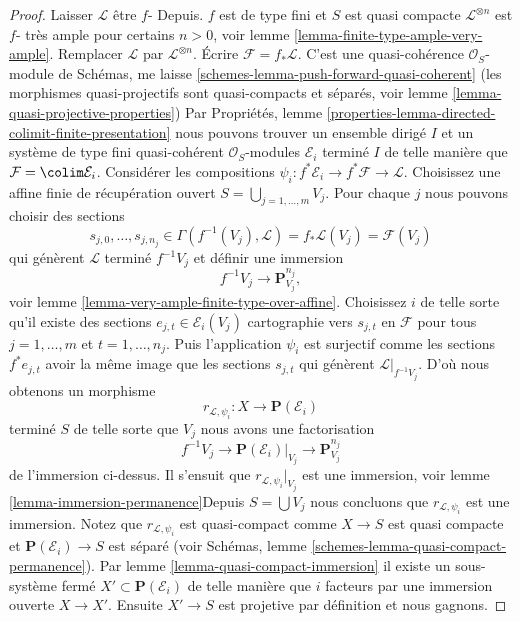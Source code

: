 \begin{proof}

Laisser $\mathcal{L}$ être $f$- Depuis. $f$ est de type fini et $S$ est quasi compacte $\mathcal{L}^{\otimes n}$ est $f$- très ample pour certains $n > 0$, voir lemme \ref{lemma-finite-type-ample-very-ample}. Remplacer $\mathcal{L}$ par $\mathcal{L}^{\otimes n}$. Écrire $\mathcal{F} = f_*\mathcal{L}$. C'est une quasi-cohérence
$\mathcal{O}_S$-module de Schémas, me laisse \ref{schemes-lemma-push-forward-quasi-coherent}
(les morphismes quasi-projectifs sont quasi-compacts et séparés, voir lemme \ref{lemma-quasi-projective-properties}) Par Propriétés, lemme \ref{properties-lemma-directed-colimit-finite-presentation}
nous pouvons trouver un ensemble dirigé $I$ et un système de type fini quasi-cohérent $\mathcal{O}_S$-modules $\mathcal{E}_i$
terminé $I$ de telle manière que $\mathcal{F} = \colim \mathcal{E}_i$. Considérer les compositions
$\psi_i : f^*\mathcal{E}_i \to f^*\mathcal{F} \to \mathcal{L}$. Choisissez une affine finie de récupération ouvert $S = \bigcup_{j = 1, \ldots, m} V_j$. Pour chaque $j$ nous pouvons choisir des sections
$$
s_{j, 0}, \ldots, s_{j, n_j} \in
\Gamma(f^{-1}(V_j), \mathcal{L}) = f_*\mathcal{L}(V_j) = \mathcal{F}(V_j)
$$
qui génèrent $\mathcal{L}$ terminé $f^{-1}V_j$ et définir une immersion
$$
f^{-1}V_j \longrightarrow \mathbf{P}^{n_j}_{V_j},
$$
voir lemme \ref{lemma-very-ample-finite-type-over-affine}. Choisissez $i$ de telle sorte qu'il existe des sections $e_{j, t} \in \mathcal{E}_i(V_j)$
cartographie vers $s_{j, t}$ en $\mathcal{F}$ pour tous $j = 1, \ldots, m$ et
$t = 1, \ldots, n_j$. Puis l'application $\psi_i$ est surjectif comme les sections $f^*e_{j, t}$ avoir la même image que les sections $s_{j, t}$
qui génèrent $\mathcal{L}|_{f^{-1}V_j}$. D'où nous obtenons un morphisme
$$
r_{\mathcal{L}, \psi_i} : X \longrightarrow \mathbf{P}(\mathcal{E}_i)
$$
terminé $S$ de telle sorte que $V_j$ nous avons une factorisation
$$
f^{-1}V_j \to \mathbf{P}(\mathcal{E}_i)|_{V_j} \to \mathbf{P}^{n_j}_{V_j}
$$
de l'immersion ci-dessus. Il s'ensuit que $r_{\mathcal{L}, \psi_i}|_{V_j}$
est une immersion, voir lemme \ref{lemma-immersion-permanence}Depuis $S = \bigcup V_j$ nous concluons que $r_{\mathcal{L}, \psi_i}$
est une immersion. Notez que $r_{\mathcal{L}, \psi_i}$ est quasi-compact comme
$X \to S$ est quasi compacte et $\mathbf{P}(\mathcal{E}_i) \to S$ est séparé (voir Schémas, lemme \ref{schemes-lemma-quasi-compact-permanence}). Par lemme \ref{lemma-quasi-compact-immersion} il existe un sous-système fermé $X' \subset \mathbf{P}(\mathcal{E}_i)$ de telle manière que $i$ facteurs par une immersion ouverte $X \to X'$. Ensuite $X' \to S$ est projetive par définition et nous gagnons.

\end{proof}

